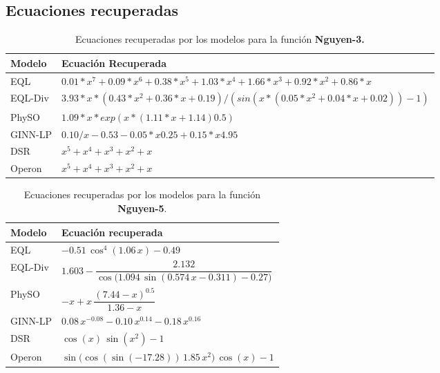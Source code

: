 \subsection*{Ecuaciones recuperadas}

\begin{table}[H]
    \centering
    \caption{Ecuaciones recuperadas por los modelos para la función \textbf{Nguyen-3.}}
    \begin{tabular}{lp{11cm}}
        \hline
        \textbf{Modelo} & \textbf{Ecuación Recuperada} \\ \hline
        EQL & $0.01*x^7 + 0.09*x^6 + 0.38*x^5 + 1.03*x^4 + 1.66*x^3 + 0.92*x^2 + 0.86*x$ \\ \hline
        EQL-Div & $3.93*x*(0.43*x^2+ 0.36*x + 0.19)/(sin(x*(0.05*x^2 + 0.04*x + 0.02)) - 1)$ \\ \hline
        PhySO & $1.09*x*exp(x*(1.11*x + 1.14)0.5)$ \\ \hline
        GINN-LP & $0.10/x-0.53 - 0.05*x0.25 + 0.15*x4.95$ \\ \hline
        DSR & $x^5 + x^4 + x^3 + x^2 + x$ \\ \hline
        Operon & $x^5 + x^4 + x^3 + x^2 + x$ \\ \hline
    \end{tabular}
\end{table}


\begin{table}[H]
    \centering
    \caption{Ecuaciones recuperadas por los modelos para la función \textbf{Nguyen-5}.}
    \begin{tabular}{lp{11cm}}
        \hline
        \textbf{Modelo} & \textbf{Ecuación recuperada} \\ \hline
        EQL &
        $-0.51\,\cos^{4}(1.06\,x) - 0.49$ \\ \hline
        EQL-Div &
        $1.603 - \dfrac{2.132}{\cos\!\bigl(1.094\,\sin(0.574\,x - 0.311) - 0.27\bigr)}$ \\ \hline
        PhySO &
        $-x + x\,\dfrac{(7.44 - x)^{0.5}}{1.36 - x}$ \\ \hline
        GINN-LP &
        $0.08\,x^{-0.08} - 0.10\,x^{0.14} - 0.18\,x^{0.16}$ \\ \hline
        DSR &
        $\cos(x)\,\sin(x^{2}) - 1$ \\ \hline
        Operon &
        $\sin\!\bigl(\cos(\sin(-17.28))\,1.85\,x^{2}\bigr)\,\cos(x) - 1$ \\ \hline
    \end{tabular}
\end{table}


